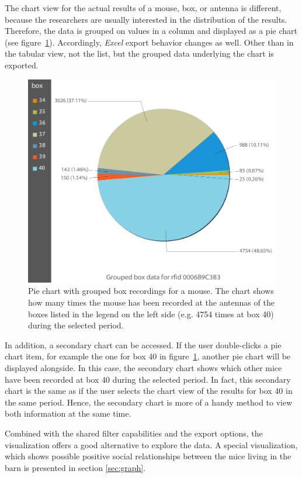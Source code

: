 The chart view for the actual results of a mouse, box, or antenna is different, because the researchers are usually interested in the distribution of the results. Therefore, the data is grouped on values in a column and displayed as a pie chart (see figure~\ref{fig:pie_chart_for_mouse}). Accordingly, \textit{Excel} export behavior changes as well. Other than in the tabular view, not the list, but the grouped data underlying the chart is exported.

\begin{figure}[htbp]
\begin{center}
  \includegraphics[width=.66\textwidth]{assets/img/pie_chart_for_mouse.png}
  \caption[Pie chart showing box recorings for a mouse]{Pie chart with grouped box recordings for a mouse. The chart shows how many times the mouse has been recorded at the antennas of the boxes listed in the legend on the left side (e.g. 4754 times at box 40) during the selected period.}
  \label{fig:pie_chart_for_mouse}
\end{center}
\end{figure}

In addition, a secondary chart can be accessed. If the user double-clicks a pie chart item, for example the one for box 40 in figure~\ref{fig:pie_chart_for_mouse}, another pie chart will be displayed alongside. In this case, the secondary chart shows which other mice have been recorded at box 40 during the selected period. In fact, this secondary chart is the same as if the user selects the chart view of the results for box 40 in the same period. Hence, the secondary chart is more of a handy method to view both information at the same time.

Combined with the shared filter capabilities and the export options, the visualization offers a good alternative to explore the data. A special visualization, which shows possible positive social relationships between the mice living in the barn is presented in section \ref{sec:graph}.

